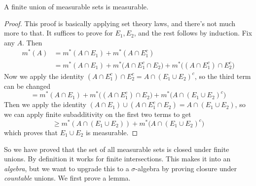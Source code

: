   \begin{lemma}
    A finite union of measurable sets is measurable. 
  \end{lemma}
  \begin{proof}
    This proof is basically applying set theory laws, and there's not much more to that. It suffices to prove for $E_1, E_2$, and the rest follows by induction. Fix any $A$. Then 
    \begin{align}
      m^\ast (A) & = m^\ast (A \cap E_1) + m^\ast (A \cap E_1^c) \\ 
                   & = m^\ast (A \cap E_1) + m^\ast \big(A \cap E_1^c \cap E_2 \big) + m^\ast \big((A \cap E_1^c) \cap E_2^c \big)
    \end{align}
    Now we apply the identity $(A \cap E_1^c) \cap E_2^c = A \cap (E_1 \cup E_2)^c$, so the third term can be changed 
    \begin{equation}
      = m^\ast (A \cap E_1) + m^\ast \big((A \cap E_1^c) \cap E_2 \big) + m^\ast \big( A \cap (E_1 \cup E_2)^c \big)
    \end{equation}
    Then we apply the identity $(A \cap E_1) \cup (A \cap E_1^c \cap E_2) = A \cap (E_1 \cup E_2)$, so we can apply finite subadditivity on the first two terms to get 
    \begin{equation}
      \geq m^\ast (A \cap (E_1 \cup E_2)) + m^\ast \big( A \cap (E_1 \cup E_2)^c \big)
    \end{equation}
    which proves that $E_1 \cup E_2$ is measurable. 
  \end{proof} 

  So we have proved that the set of all measurable sets is closed under finite unions. By definition it works for finite intersections. This makes it into an \textit{algebra}, but we want to upgrade this to a $\sigma$-algebra by proving closure under \textit{countable} unions. We first prove a lemma. 

